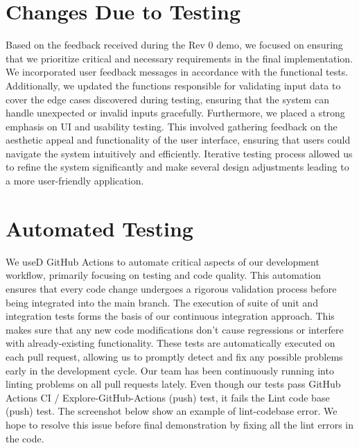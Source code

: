 \documentclass[12pt, titlepage]{article}
\begin{document}
\section{Changes Due to Testing}

Based on the feedback received during the Rev 0 demo, we focused on ensuring that we prioritize critical and necessary requirements in the final implementation. We incorporated user feedback messages in accordance with the functional tests. Additionally, we updated the functions responsible for validating input data to cover the edge cases discovered during testing, ensuring that the system can handle unexpected or invalid inputs gracefully. Furthermore, we placed a strong emphasis on UI and usability testing. This involved gathering feedback on the aesthetic appeal and functionality of the user interface, ensuring that users could navigate the system intuitively and efficiently. Iterative testing process allowed us to refine the system significantly and make several design adjustments leading to a more user-friendly application.

\section{Automated Testing}

We useD GitHub Actions to automate critical aspects of our development workflow, primarily focusing on testing and code quality. This automation ensures that every code change undergoes a rigorous validation process before being integrated into the main branch. The execution of suite of unit and integration tests forms the basis of our continuous integration approach. This makes sure that any new code modifications don't cause regressions or interfere with already-existing functionality. These tests are automatically executed on each pull request, allowing us to promptly detect and fix any possible problems early in the development cycle. Our team has been continuously running into linting problems on all pull requests lately. Even though our tests pass GitHub Actions CI / Explore-GitHub-Actions (push) test, it fails the Lint code base (push) test. The screenshot below show an example of lint-codebase error. We hope to resolve this issue before final demonstration by fixing all the lint errors in the code.
\end{document}
